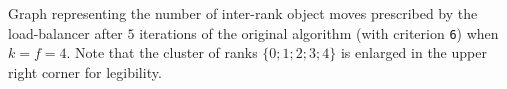 Graph representing the number of inter-rank object moves prescribed by the load-balancer
after $5$ iterations of the original algorithm (with criterion \texttt{6}) when $k=f=4$.
Note that the cluster of ranks $\{0;1;2;3;4\}$ is enlarged in the upper right corner for
legibility.
